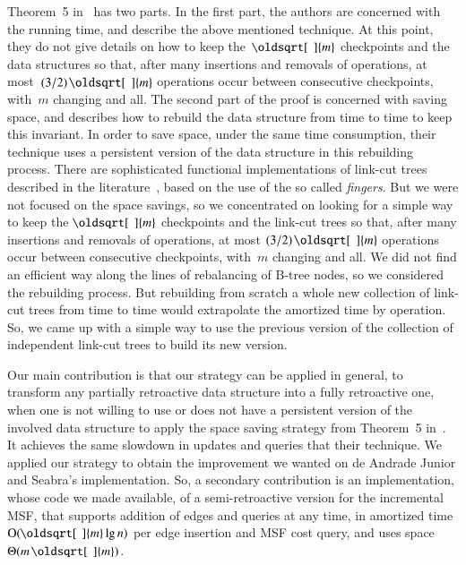 \documentclass[3p,times,procedia]{elsarticle}
\renewcommand{\sqrt}[2][\mkern8mu]{\mkern-1mu\mathop{\oldsqrt[#1]{#2}}}
\newcommand{\Oh}{\mathrm{O}}
\begin{document}
Theorem~5 in~\cite{DemaineIL2007} has two parts.  In the first part, the authors
are concerned with the running time, and describe the above mentioned technique.
At this point, they do not give details on how to keep the~$\sqrt{m}$ checkpoints 
and the data structures so that, after many insertions and removals of operations, 
at most~$(3/2)\sqrt{m}$ operations occur between consecutive checkpoints, with~$m$ 
changing and all. The second part of the proof is concerned with saving space, and 
describes how to rebuild the data structure from time to time to keep this invariant.  
In order to save space, under the same time consumption, their technique uses 
a persistent version of the data structure in this rebuilding process.  
There are sophisticated functional implementations of link-cut trees described in 
the literature~\cite{DemaineLP2008}, based on the use of the so called \emph{fingers}.  
But we were not focused on the space savings, so we concentrated on looking for 
a simple way to keep the $\sqrt{m}$ checkpoints and the link-cut trees so that, 
after many insertions and removals of operations, at most $(3/2)\sqrt{m}$ 
operations occur between consecutive checkpoints, with~$m$ changing and all.
We did not find an efficient way along the lines of rebalancing of B-tree nodes, 
so we considered the rebuilding process.  But rebuilding from scratch a whole 
new collection of link-cut trees from time to time would extrapolate the 
amortized time by operation.  So, we came up with a simple way to use the 
previous version of the collection of independent link-cut trees to build 
its new version.  

Our main contribution is that our strategy can be applied in general, 
to transform any partially retroactive data structure into a fully retroactive 
one, when one is not willing to use or does not have a persistent version of 
the involved data structure to apply the space saving strategy from Theorem~5 
in~\cite{DemaineIL2007}.  It achieves the same slowdown in updates and queries 
that their technique.  We applied our strategy to obtain the improvement we 
wanted on de Andrade Junior and Seabra's implementation.  So, a secondary 
contribution is an implementation, whose code we made available, of a 
semi-retroactive version for the incremental MSF, that supports addition of 
edges and queries at any time, in amortized time $\Oh(\sqrt{m}\lg n)$ per 
edge insertion and MSF cost query, and uses space $\Theta(m\sqrt{m})$.  
\end{document}
